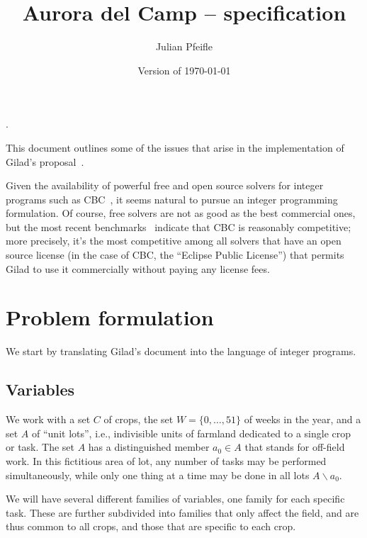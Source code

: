\documentclass[11pt]{amsart}
\numberwithin{equation}{section}
\begin{document}
\renewcommand*\descriptionlabel[1]{%
\hspace\labelsep\normalfont\itshape #1:}.

\title{Aurora del Camp -- specification}
\author{Julian Pfeifle}
\date{Version of \today}
\maketitle

This document outlines some of the issues that arise in the
implementation of Gilad's proposal~\cite{buzi11}.

\medskip
Given the availability of powerful free and open source solvers for
integer programs such as CBC~\cite{cbc}, it seems natural to pursue an
integer programming formulation. Of course, free solvers are not as
good as the best commercial ones, but the most recent
benchmarks~\cite{mittelmann11} indicate that CBC is reasonably
competitive; more precisely, it's the most competitive among all
solvers that have an open source license (in the case of CBC, the
``Eclipse Public License'') that permits Gilad to use it commercially
without paying any license fees.

\section{Problem formulation}

We start by translating Gilad's document into the language of integer
programs. %
  
\subsection{Variables}

We work with a set $C$ of crops, the set $W=\{0,\dots,51\}$ of weeks
in the year, and a set $A$ of ``unit lots'', i.e., indivisible units
of farmland dedicated to a single crop or task. The set $A$ has a
distinguished member $a_0\in A$ that stands for off-field work. In
this fictitious area of lot, any number of tasks may be performed
simultaneously, while only one thing at a time may be done in all
lots $A\smallsetminus a_0$. 

We will have several different families of variables, one family for
each specific task. These are further subdivided into families that
only affect the field, and are thus common to all crops, and those
that are specific to each crop.
\end{document}
